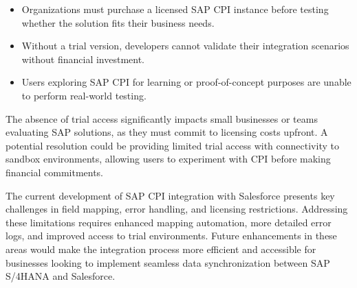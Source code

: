 \begin{itemize}
    \item Organizations must purchase a licensed SAP CPI instance before testing whether the solution fits their business needs.
    \item Without a trial version, developers cannot validate their integration scenarios without financial investment.
    \item Users exploring SAP CPI for learning or proof-of-concept purposes are unable to perform real-world testing.
\end{itemize}

The absence of trial access significantly impacts small businesses or teams evaluating SAP solutions, as they must commit to licensing costs upfront. A potential resolution could be providing limited trial access with connectivity to sandbox environments, allowing users to experiment with CPI before making financial commitments.

The current development of SAP CPI integration with Salesforce presents key challenges in field mapping, error handling, and licensing restrictions. Addressing these limitations requires enhanced mapping automation, more detailed error logs, and improved access to trial environments. Future enhancements in these areas would make the integration process more efficient and accessible for businesses looking to implement seamless data synchronization between SAP S/4HANA and Salesforce.


\newpage
